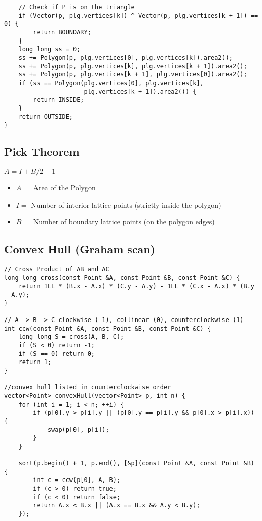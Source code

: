 \documentclass[11pt,a4paper]{article}
\begin{document}
\begin{multicols*}{2}
\begin{lstlisting}
    // Check if P is on the triangle
    if (Vector(p, plg.vertices[k]) ^ Vector(p, plg.vertices[k + 1]) == 0) {
        return BOUNDARY;
    }
    long long ss = 0;
    ss += Polygon(p, plg.vertices[0], plg.vertices[k]).area2();
    ss += Polygon(p, plg.vertices[k], plg.vertices[k + 1]).area2();
    ss += Polygon(p, plg.vertices[k + 1], plg.vertices[0]).area2();
    if (ss == Polygon(plg.vertices[0], plg.vertices[k],
                      plg.vertices[k + 1]).area2()) {
        return INSIDE;
    }
    return OUTSIDE;
}
\end{lstlisting}

\subsection{Pick Theorem}
$A = I + B/2 - 1$
\begin{itemize}
    \item $A = $ Area of the Polygon
    \item $I = $ Number of interior lattice points (strictly inside the polygon)
    \item $B = $ Number of boundary lattice points (on the polygon edges) 
\end{itemize}

\subsection{Convex Hull (Graham scan)}
\begin{lstlisting}
// Cross Product of AB and AC
long long cross(const Point &A, const Point &B, const Point &C) {
    return 1LL * (B.x - A.x) * (C.y - A.y) - 1LL * (C.x - A.x) * (B.y - A.y);
}

// A -> B -> C clockwise (-1), collinear (0), counterclockwise (1)
int ccw(const Point &A, const Point &B, const Point &C) {
    long long S = cross(A, B, C);
    if (S < 0) return -1;
    if (S == 0) return 0;
    return 1;
}

//convex hull listed in counterclockwise order
vector<Point> convexHull(vector<Point> p, int n) {
    for (int i = 1; i < n; ++i) {
        if (p[0].y > p[i].y || (p[0].y == p[i].y && p[0].x > p[i].x)) {
            swap(p[0], p[i]);
        }
    }

    sort(p.begin() + 1, p.end(), [&p](const Point &A, const Point &B) {
        int c = ccw(p[0], A, B);
        if (c > 0) return true;
        if (c < 0) return false;
        return A.x < B.x || (A.x == B.x && A.y < B.y);
    });


\end{lstlisting}
\end{multicols*}
\end{document}
